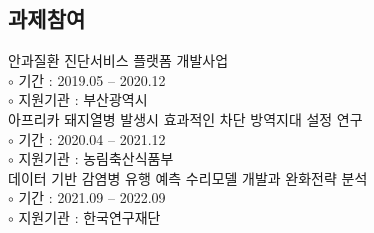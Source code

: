 \documentclass[11pt]{article} %
\begin{document}
\subsection*{과제참여}
\newcommand\myprojs{
	안과질환 진단서비스 플랫폼 개발사업 \\
	$\circ$ 기간 : 2019.05 -- 2020.12 \\
	$\circ$ 지원기관 : 부산광역시 \\
	
	아프리카 돼지열병 발생시 효과적인 차단 방역지대 설정 연구 \\
	$\circ$ 기간 : 2020.04 -- 2021.12 \\
	$\circ$ 지원기관 : 농림축산식품부 \\
	
	데이터 기반 감염병 유행 예측 수리모델 개발과 완화전략 분석 \\
	$\circ$ 기간 : 2021.09 -- 2022.09 \\
	$\circ$ 지원기관 : 한국연구재단
}
\newcommand\myprojseng{
	Development of a Service Platform for Ophthalmology Disease Diagnosis\\
	$\circ$ Period : 2019.05 -- 2020.12 \\
	$\circ$ Support : Busan Metropolitan City \\
	
	Study on establishing effective blocking zones for the spread of Africa swine fever\\
	$\circ$ Period : 2020.04 -- 2021.12 \\
	$\circ$ Support : Ministry of Agriculture, Food and Rural Affairs \\
	
	Development of mathematical model for data-based infectious disease outbreak prediction and mitigation strategy analysis \\
	$\circ$ Period : 2021.09 -- 2022.09 \\
	$\circ$ Support : National Research Foundation of Korea
}

\myprojs
\end{document}
